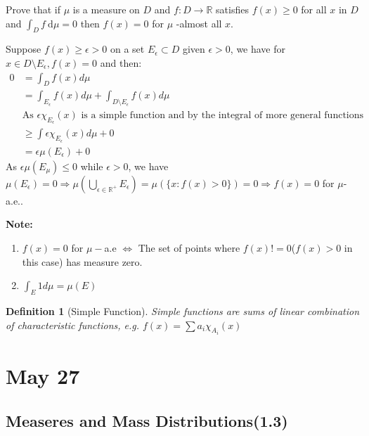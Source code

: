 \documentclass[12pt, a4paper]{article}
\newtheorem{definition}{Definition}[subsection]
\begin{document}
\begin{customexercise}{1.24}
    Prove that if $\mu$ is a measure on $D$ and $f: D \rightarrow \mathbb{R}$ satisfies $f(x) \geq 0$ for all $x$ in $D$ and $\int_{D} f \mathrm{~d} \mu=0$ then $f(x)=0$ for $\mu$ -almost all $x$.
\end{customexercise}

\begin{customsol}{1.24}
Suppose $f(x)\geq\epsilon>0$ on a set $E_\epsilon\subset D$ given $\epsilon>0$, we have for $x\in D\setminus E_\epsilon, f(x)=0$ and then:
$$\begin{aligned}
    0 &= \int_D f(x) d\mu\\ &= \int_{E_\epsilon} f(x)d\mu + \int_{D\setminus E_\epsilon} f(x)d\mu\\
    &\text{As }\epsilon \chi_{E_\epsilon}(x) \text{ is a simple function and by the integral of more general functions}\\
    &\geq \int \epsilon \chi_{E_\epsilon}(x) d\mu + 0 \\ &= \epsilon\mu(E_\epsilon) + 0
\end{aligned}$$
As $\epsilon\mu(E_\mu)\leq 0$ while $\epsilon>0$, we have $\mu(E_\epsilon) = 0 \Rightarrow \mu\left(\bigcup_{\epsilon\in\mathbb{R}^+} E_\epsilon\right) = \mu\left(\{x: f(x)>0\}\right) = 0\Rightarrow f(x) = 0$ for $\mu$-a.e.. 
\end{customsol}

\textbf{Note: } 
\begin{enumerate}
    \item $f(x) = 0$ for $\mu-$a.e $\Leftrightarrow$ The set of points where $f(x)!=0$($f(x)>0$ in this case) has measure zero.
    \item $\displaystyle\int_E 1 d\mu = \mu(E)$
\end{enumerate}
\begin{definition}[Simple Function]
    Simple functions are sums of linear combination of characteristic functions, e.g. $\displaystyle f(x) = \sum a_i \chi_{A_i}(x)$
\end{definition}

\newpage
\section{May 27}
\subsection{Measeres and Mass Distributions(1.3)}
\end{document}
